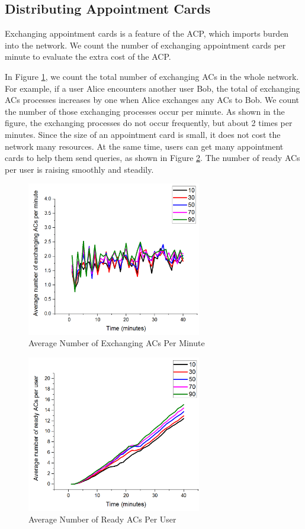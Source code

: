 \documentclass[conference]{IEEEtran}
\begin{document}
\subsection{ Distributing Appointment Cards}

\noindent Exchanging appointment cards is a feature of the ACP, which imports burden into the network. We count the number of exchanging appointment cards per minute to evaluate the extra cost of the ACP.

In Figure \ref{fig:F422AverageNumberofExchangingACsPerMinute}, we count the total number of exchanging ACs in the whole network. For example, if a user Alice encounters another user Bob, the total of exchanging ACs processes increases by one when Alice exchanges any ACs to Bob. We count the number of those exchanging processes occur per minute. As shown in the figure, the exchanging processes do not occur frequently, but about 2 times per minutes. Since the size of an appointment card is small, it does not cost the network many resources. At the same time, users can get many appointment cards to help them send queries, as shown in Figure \ref{fig:F421AverageNumberofReadyACsPerUser}. The number of ready ACs per user is raising smoothly and steadily. 

\begin{figure} [hbtp]
  \centering 
  \includegraphics[width=3.0in]{figures/F422AverageNumberofExchangingACsPerMinute.png}
  \caption{Average Number of Exchanging ACs Per Minute} 
  \label{fig:F422AverageNumberofExchangingACsPerMinute} %
\end{figure}

\begin{figure} [hbtp]
  \centering 
  \includegraphics[width=3.0in]{figures/F421AverageNumberofReadyACsPerUser.png}
  \caption{Average Number of Ready ACs Per User} 
  \label{fig:F421AverageNumberofReadyACsPerUser} %
\end{figure}
\end{document}
